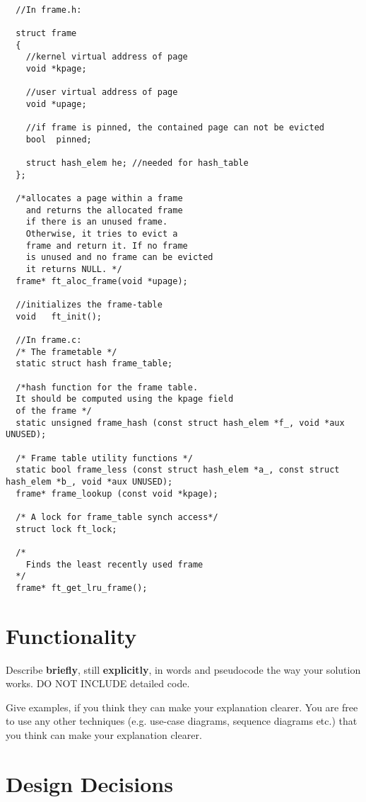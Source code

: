 \begin{lstlisting}

  //In frame.h:

  struct frame
  {
	//kernel virtual address of page
	void *kpage; 	
	  
	//user virtual address of page
	void *upage;	
	
	//if frame is pinned, the contained page can not be evicted
	bool  pinned;		
	
	struct hash_elem he; //needed for hash_table
  };

  /*allocates a page within a frame
    and returns the allocated frame
    if there is an unused frame.
    Otherwise, it tries to evict a 
    frame and return it. If no frame
    is unused and no frame can be evicted
    it returns NULL. */
  frame* ft_aloc_frame(void *upage);
  
  //initializes the frame-table
  void	 ft_init();

  //In frame.c:
  /* The frametable */
  static struct hash frame_table;

  /*hash function for the frame table.
  It should be computed using the kpage field
  of the frame */
  static unsigned frame_hash (const struct hash_elem *f_, void *aux UNUSED);
  
  /* Frame table utility functions */
  static bool frame_less (const struct hash_elem *a_, const struct hash_elem *b_, void *aux UNUSED);
  frame* frame_lookup (const void *kpage);

  /* A lock for frame_table synch access*/
  struct lock ft_lock;

  /*
    Finds the least recently used frame
  */
  frame* ft_get_lru_frame();

\end{lstlisting}


\section{Functionality}

Describe \textbf{briefly}, still \textbf{explicitly}, in words and pseudocode the way your solution works. DO NOT INCLUDE detailed code. 

Give examples, if you think they can make your explanation clearer. You are free to use any other techniques (e.g. use-case diagrams, sequence diagrams etc.) that you think can make your explanation clearer. 


\section{Design Decisions}


